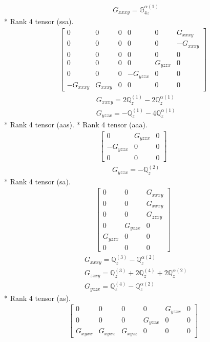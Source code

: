 \documentclass[fleqn,8pt,landscape]{jsarticle}
\begin{document}
\begin{align*}
& G_{xxxy} = \mathbb{G}_{4z}^{\alpha(1)}
\end{align*}
* Rank 4 tensor (ssa).
\begin{align*}
\begin{bmatrix} 0 & 0 & 0 & 0 & 0 & G_{xxxy} \\ 0 & 0 & 0 & 0 & 0 & - G_{xxxy} \\ 0 & 0 & 0 & 0 & 0 & 0 \\ 0 & 0 & 0 & 0 & G_{yzzx} & 0 \\ 0 & 0 & 0 & - G_{yzzx} & 0 & 0 \\ - G_{xxxy} & G_{xxxy} & 0 & 0 & 0 & 0 \end{bmatrix}
\end{align*}
\begin{align*}
& G_{xxxy} = 2 \mathbb{Q}_{z}^{(1)} - 2 \mathbb{Q}_{z}^{\alpha(1)} \\
& G_{yzzx} = - \mathbb{Q}_{z}^{(1)} - 4 \mathbb{Q}_{z}^{\alpha(1)}
\end{align*}
* Rank 4 tensor (aas).
* Rank 4 tensor (aaa).
\begin{align*}
\begin{bmatrix} 0 & G_{yzzx} & 0 \\ - G_{yzzx} & 0 & 0 \\ 0 & 0 & 0 \end{bmatrix}
\end{align*}
\begin{align*}
& G_{yzzx} = - \mathbb{Q}_{z}^{(2)}
\end{align*}
* Rank 4 tensor (sa).
\begin{align*}
\begin{bmatrix} 0 & 0 & G_{xxxy} \\ 0 & 0 & G_{xxxy} \\ 0 & 0 & G_{zzxy} \\ 0 & G_{yzzx} & 0 \\ G_{yzzx} & 0 & 0 \\ 0 & 0 & 0 \end{bmatrix}
\end{align*}
\begin{align*}
& G_{xxxy} = \mathbb{Q}_{z}^{(3)} - \mathbb{Q}_{z}^{\alpha(2)} \\
& G_{zzxy} = \mathbb{Q}_{z}^{(3)} + 2 \mathbb{Q}_{z}^{(4)} + 2 \mathbb{Q}_{z}^{\alpha(2)} \\
& G_{yzzx} = \mathbb{Q}_{z}^{(4)} - \mathbb{Q}_{z}^{\alpha(2)}
\end{align*}
* Rank 4 tensor (as).
\begin{align*}
\begin{bmatrix} 0 & 0 & 0 & 0 & G_{yzzx} & 0 \\ 0 & 0 & 0 & G_{yzzx} & 0 & 0 \\ G_{xyxx} & G_{xyxx} & G_{xyzz} & 0 & 0 & 0 \end{bmatrix}
\end{align*}
\end{document}
